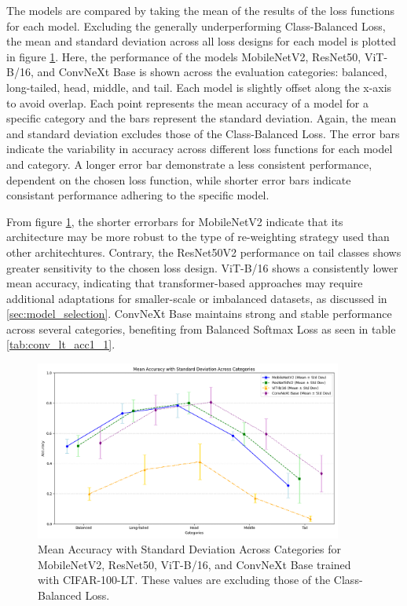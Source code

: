 The models are compared by taking the mean of the results of the loss functions for each model. Excluding the generally underperforming Class-Balanced Loss, the mean and standard deviation across all loss designs for each model is plotted in figure \ref{fig:mean_loss_comparison_line_noCB}.  Here, the performance of the models MobileNetV2, ResNet50, ViT-B/16, and ConvNeXt Base is shown across the evaluation categories: balanced, long-tailed, head, middle, and tail. Each model is slightly offset along the x-axis to avoid overlap. Each point represents the mean accuracy of a model for a specific category and the bars represent the standard deviation. Again, the mean and standard deviation excludes those of the Class-Balanced Loss. The error bars indicate the variability in accuracy across different loss functions for each model and category. A longer error bar demonstrate a less consistent performance, dependent on the chosen loss function, while shorter error bars indicate consistant performance adhering to the specific model.

From figure \ref{fig:mean_loss_comparison_line_noCB}, the shorter errorbars for MobileNetV2 indicate that its architecture may be more robust to the type of re-weighting strategy used than other architechtures. Contrary, the ResNet50V2 performance on tail classes shows greater sensitivity to the chosen loss design. ViT-B/16 shows a consistently lower mean accuracy, indicating that transformer-based approaches may require additional adaptations for smaller-scale or imbalanced datasets, as discussed in \ref{sec:model_selection}. ConvNeXt Base maintains strong and stable performance across several categories, benefiting from Balanced Softmax Loss as seen in table \ref{tab:conv_lt_acc1_1}.

\begin{figure}[H]
    \centering
    \includegraphics[width=0.9\textwidth]{Images/Plots/mean_loss_comparison_noCB.png}
    \caption{Mean Accuracy with Standard Deviation Across Categories for MobileNetV2, ResNet50, ViT-B/16, and ConvNeXt Base trained with CIFAR-100-LT. These values are excluding those of the Class-Balanced Loss.}
    \label{fig:mean_loss_comparison_line_noCB}
\end{figure}

